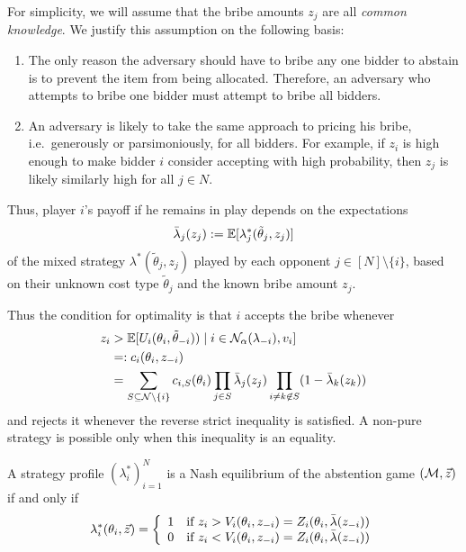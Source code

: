For simplicity, we will assume that the bribe amounts $z_j$ are all \emph{common knowledge}.
%
We justify this assumption on the following basis:
%
\begin{enumerate}
  \item 
    The only reason the adversary should have to bribe any one bidder to abstain is to prevent the item from being allocated. 
    Therefore, an adversary who attempts to bribe one bidder must attempt to bribe all bidders.
  
  \item
    An adversary is likely to take the same approach to pricing his bribe, i.e.~generously or parsimoniously, for all bidders.
    For example, if $z_i$ is high enough to make bidder $i$ consider accepting with high probability, then $z_j$ is likely similarly high for all $j\in N$.

\end{enumerate}

Thus, player $i$'s payoff if he remains in play depends on the expectations
%
\[
  \bar\lambda_j(z_j) := \mathbb{E}[\lambda_j^*(\tilde{\theta}_j,z_j)]
\]
%
of the mixed strategy $\lambda^*(\tilde{\theta}_j,z_j)$ played by each opponent $j\in [N]\setminus\{i\}$, based on their unknown cost type $\tilde{\theta}_j$ and the known bribe amount $z_j$.

Thus the condition for optimality is that $i$ accepts the bribe whenever
\begin{align*}
  z_i &> \mathbb{E}[U_i(\theta_i,\tilde{\theta}_{-i})) \mid i\in \mathcal{N}_\alpha(\lambda_{-i}), v_i] \\
  &=: c_i(\theta_i,z_{-i}) \\
  &= \sum_{S\subseteq \mathcal{N}\setminus\{i\}} c_{i,S}(\theta_i) \prod_{j\in S}\bar\lambda_j(z_j) \prod_{i\neq k\not\in S} (1-\bar\lambda_k(z_k))
\end{align*}
%
and rejects it whenever the reverse strict inequality is satisfied.
%
A non-pure strategy is possible only when this inequality is an equality.

\begin{proposition}
  \label{thm:bidder-equilibrium}

  A strategy profile $(\lambda_i^*)_{i=1}^N$ is a Nash equilibrium of the abstention game $(\mathcal{M},\vec{z})$ if and only if
  \[
    \lambda_i^*(\theta_i,\vec{z}) = \left\{\begin{array}{ll} 
      1 & \text{if } z_i > V_i(\theta_i,z_{-i}) = Z_i(\theta_i,\bar\lambda(z_{-i})) \\ 
      0 & \text{if } z_i < V_i(\theta_i,z_{-i}) = Z_i(\theta_i,\bar\lambda(z_{-i}))
    \end{array}\right.
  \]

\end{proposition}

